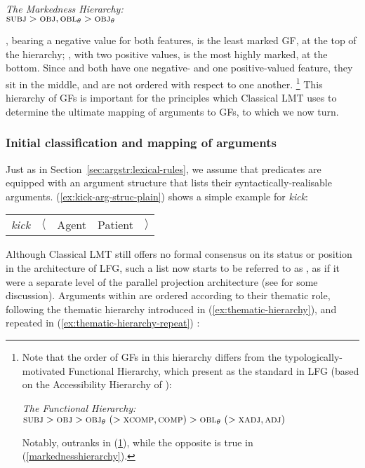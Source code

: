\documentclass[output=paper]{langscibook}
\begin{document}
\begin{exe}
\ex \label{markednesshierarchy}
\textit{The Markedness Hierarchy:}\\
$\textsc{subj}{} > \textsc{obj}{}, \mbox{\textsc{obl}$_{\theta}$}{} >  \mbox{\textsc{obj}$_{\theta}$}{}$
\end{exe}
%
\SUBJ, bearing a negative value for both features, is the least marked GF, at
the top of the hierarchy; \OBJTHETA, with two positive values, is the most
highly marked, at the bottom. Since \OBJ and \OBLTHETA both have one negative-
and one positive-valued feature, they sit in the middle, and are not ordered
with respect to one another.%
%
\footnote{Note that the order of GFs in this hierarchy differs from the
  typologically-motivated Functional Hierarchy, which \citet[11]{DLM:LFG}
  present as the standard in LFG (based on the Accessibility Hierarchy of
  \citealt{keenan1977noun}):

  \begin{exe}
    \ex \label{functionalhierarchy}\textit{The Functional Hierarchy:}\\
    $\textsc{subj}{} > \textsc{obj}{} > \mbox{\textsc{obj}$_{\theta}$}{}\ (> \textsc{xcomp}{}, \textsc{comp}{}) > \mbox{\textsc{obl}$_{\theta}$}{}\ (> \textsc{xadj}{}, \textsc{adj}{})$ \label{ex:functional-hierarchy}
  \end{exe}
%
  Notably, \OBJTHETA outranks \OBLTHETA in (\ref{functionalhierarchy}), while
  the opposite is true in (\ref{markednesshierarchy}).}
%
This hierarchy of GFs is important for the principles which Classical LMT uses
to determine the ultimate mapping of arguments to GFs, to which we now turn.

\subsubsection{Initial classification and mapping of
  arguments}\label{sec:argstr:lmt-initial}

Just as in Section~\ref{sec:argstr:lexical-rules}, we assume that predicates are
equipped with an argument structure that lists their syntactically-realisable
arguments. (\ref{ex:kick-arg-struc-plain}) shows a simple example for
\textit{kick}:

\ea\label{ex:kick-arg-struc-plain}
\begin{tabular}[t]{rcccc}
  \textit{kick} & $\langle$  & Agent  & Patient   & $\rangle$\\
\end{tabular}
\z
%
Although Classical LMT still offers no formal consensus on its status or
position in the architecture of LFG, such a list now starts to be referred to as
\fm{\astruc}, as if it were a separate level of the parallel projection
architecture (see \citealt[97--106]{falk2001lexical} for some discussion).
Arguments within \astruc{} are ordered according to their thematic role,
following the thematic hierarchy introduced in (\ref{ex:thematic-hierarchy}),
and repeated in (\ref{ex:thematic-hierarchy-repeat})
\citep[23]{bresnan1989locative}:
\end{document}
